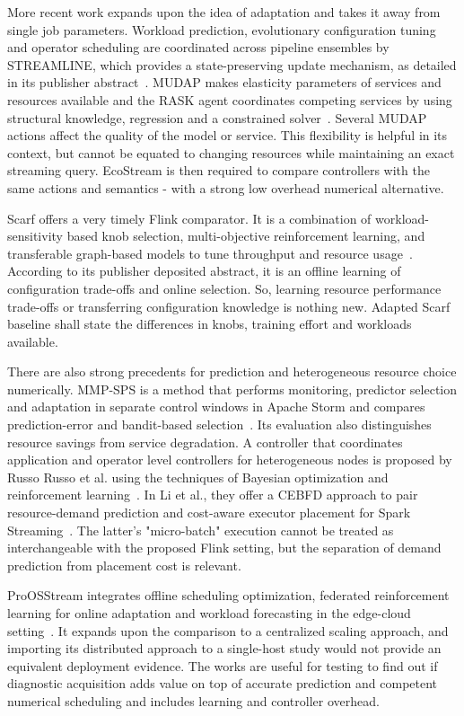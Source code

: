 More recent work expands upon the idea of adaptation and takes it away from single job parameters. Workload prediction, evolutionary configuration tuning and operator scheduling are coordinated across pipeline ensembles by STREAMLINE, which provides a state-preserving update mechanism, as detailed in its publisher abstract~\cite{pedratscher2025streamline}. MUDAP makes elasticity parameters of services and resources available and the RASK agent coordinates competing services by using structural knowledge, regression and a constrained solver~\cite{sedlak2026mudap}. Several MUDAP actions affect the quality of the model or service. This flexibility is helpful in its context, but cannot be equated to changing resources while maintaining an exact streaming query. EcoStream is then required to compare controllers with the same actions and semantics - with a strong low overhead numerical alternative.

Scarf offers a very timely Flink comparator. It is a combination of workload-sensitivity based knob selection, multi-objective reinforcement learning, and transferable graph-based models to tune throughput and resource usage~\cite{liu2026scarf}. According to its publisher deposited abstract, it is an offline learning of configuration trade-offs and online selection. So, learning resource performance trade-offs or transferring configuration knowledge is nothing new. Adapted Scarf baseline shall state the differences in knobs, training effort and workloads available.

There are also strong precedents for prediction and heterogeneous resource choice numerically. MMP-SPS is a method that performs monitoring, predictor selection and adaptation in separate control windows in Apache Storm and compares prediction-error and bandit-based selection~\cite{wladdimiro2026mmpsps}. Its evaluation also distinguishes resource savings from service degradation. A controller that coordinates application and operator level controllers for heterogeneous nodes is proposed by Russo Russo et al. using the techniques of Bayesian optimization and reinforcement learning~\cite{russorusso2023hierarchical}. In Li et al., they offer a CEBFD approach to pair resource-demand prediction and cost-aware executor placement for Spark Streaming~\cite{li2024cebfd}. The latter's "micro-batch" execution cannot be treated as interchangeable with the proposed Flink setting, but the separation of demand prediction from placement cost is relevant.

ProOSStream integrates offline scheduling optimization, federated reinforcement learning for online adaptation and workload forecasting in the edge-cloud setting~\cite{lajili2026proosstream}. It expands upon the comparison to a centralized scaling approach, and importing its distributed approach to a single-host study would not provide an equivalent deployment evidence. The works are useful for testing to find out if diagnostic acquisition adds value on top of accurate prediction and competent numerical scheduling and includes learning and controller overhead.

